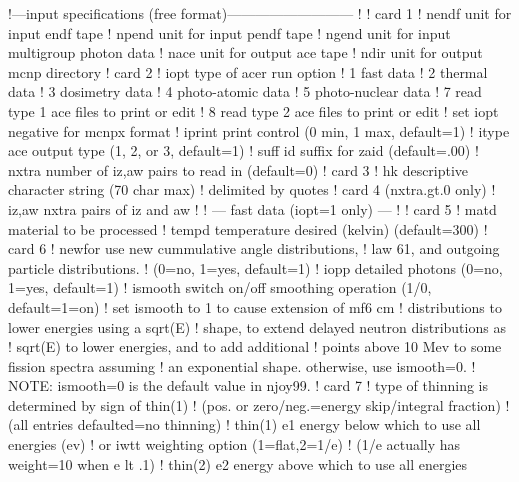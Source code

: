 \small
\begin{ccode}

   !---input specifications (free format)---------------------------
   !
   ! card 1
   !    nendf    unit for input endf tape
   !    npend    unit for input pendf tape
   !    ngend    unit for input multigroup photon data
   !    nace     unit for output ace tape
   !    ndir     unit for output mcnp directory
   ! card 2
   !    iopt     type of acer run option
   !               1   fast data
   !               2   thermal data
   !               3   dosimetry data
   !               4   photo-atomic data
   !               5   photo-nuclear data
   !               7   read type 1 ace files to print or edit
   !               8   read type 2 ace files to print or edit
   !                set iopt negative for mcnpx format
   !    iprint   print control (0 min, 1 max, default=1)
   !    itype    ace output type (1, 2, or 3, default=1)
   !    suff     id suffix for zaid (default=.00)
   !    nxtra    number of iz,aw pairs to read in (default=0)
   ! card 3
   !    hk       descriptive character string (70 char max)
   !             delimited by quotes
   ! card 4 (nxtra.gt.0 only)
   !    iz,aw    nxtra pairs of iz and aw
   !
   !    --- fast data (iopt=1 only) ---
   !
   ! card 5
   !    matd     material to be processed
   !    tempd    temperature desired (kelvin) (default=300)
   ! card 6
   !    newfor   use new cummulative angle distributions,
   !               law 61, and outgoing particle distributions.
   !               (0=no, 1=yes, default=1)
   !    iopp     detailed photons (0=no, 1=yes, default=1)
   !    ismooth  switch on/off smoothing operation (1/0, default=1=on)
   !               set ismooth to 1 to cause extension of mf6 cm
   !               distributions to lower energies using a sqrt(E)
   !               shape, to extend delayed neutron distributions as
   !               sqrt(E) to lower energies, and to add additional
   !               points above 10 Mev to some fission spectra assuming
   !               an exponential shape.  otherwise, use ismooth=0.
   !               NOTE:  ismooth=0 is the default value in njoy99.
   ! card 7
   !  type of thinning is determined by sign of thin(1)
   !  (pos. or zero/neg.=energy skip/integral fraction)
   !  (all entries defaulted=no thinning)
   !    thin(1)  e1 energy below which to use all energies (ev)
   !             or iwtt weighting option (1=flat,2=1/e)
   !             (1/e actually has weight=10 when e lt .1)
   !    thin(2)  e2 energy above which to use all energies

\end{ccode}
